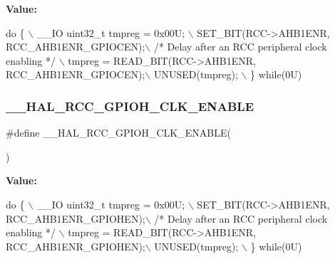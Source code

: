 {\bfseries Value\+:}
\begin{DoxyCode}
\textcolor{keywordflow}{do} \{ \(\backslash\)
                                        \_\_IO uint32\_t tmpreg = 0x00U; \(\backslash\)
                                        SET\_BIT(RCC->AHB1ENR, RCC\_AHB1ENR\_GPIOCEN);\(\backslash\)
                                        \textcolor{comment}{/* Delay after an RCC peripheral clock enabling */} \(\backslash\)
                                        tmpreg = READ\_BIT(RCC->AHB1ENR, RCC\_AHB1ENR\_GPIOCEN);\(\backslash\)
                                        UNUSED(tmpreg); \(\backslash\)
                                          \} \textcolor{keywordflow}{while}(0U)
\end{DoxyCode}
\mbox{\label{group___r_c_c___a_h_b1___clock___enable___disable_ga041e72359b94f19569e774030fc6ebff}} 
\subsubsection{\texorpdfstring{\+\_\+\+\_\+\+H\+A\+L\+\_\+\+R\+C\+C\+\_\+\+G\+P\+I\+O\+H\+\_\+\+C\+L\+K\+\_\+\+E\+N\+A\+B\+LE}{\_\_HAL\_RCC\_GPIOH\_CLK\_ENABLE}}
{\footnotesize\ttfamily \#define \+\_\+\+\_\+\+H\+A\+L\+\_\+\+R\+C\+C\+\_\+\+G\+P\+I\+O\+H\+\_\+\+C\+L\+K\+\_\+\+E\+N\+A\+B\+LE(\begin{DoxyParamCaption}{ }\end{DoxyParamCaption})}

{\bfseries Value\+:}
\begin{DoxyCode}
\textcolor{keywordflow}{do} \{ \(\backslash\)
                                        \_\_IO uint32\_t tmpreg = 0x00U; \(\backslash\)
                                        SET\_BIT(RCC->AHB1ENR, RCC\_AHB1ENR\_GPIOHEN);\(\backslash\)
                                        \textcolor{comment}{/* Delay after an RCC peripheral clock enabling */} \(\backslash\)
                                        tmpreg = READ\_BIT(RCC->AHB1ENR, RCC\_AHB1ENR\_GPIOHEN);\(\backslash\)
                                        UNUSED(tmpreg); \(\backslash\)
                                         \} \textcolor{keywordflow}{while}(0U)
\end{DoxyCode}
